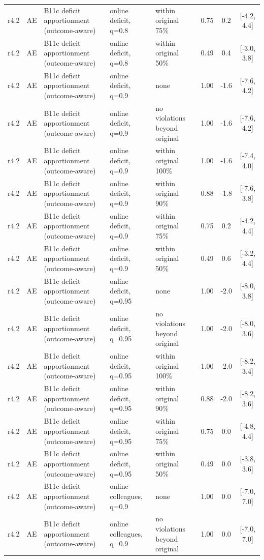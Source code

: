 \documentclass[10pt,onecolumn,letterpaper]{article}
\begin{document}
\begin{longtable}{lllp{4.2cm}p{3.4cm}ccc}
r4.2 & AE & B11c deficit apportionment (outcome-aware) & online deficit, q=0.8 & within original 75\% & 0.75 & 0.2 & [-4.2, 4.4] \\
r4.2 & AE & B11c deficit apportionment (outcome-aware) & online deficit, q=0.8 & within original 50\% & 0.49 & 0.4 & [-3.0, 3.8] \\
r4.2 & AE & B11c deficit apportionment (outcome-aware) & online deficit, q=0.9 & none & 1.00 & -1.6 & [-7.6, 4.2] \\
r4.2 & AE & B11c deficit apportionment (outcome-aware) & online deficit, q=0.9 & no violations beyond original & 1.00 & -1.6 & [-7.6, 4.2] \\
r4.2 & AE & B11c deficit apportionment (outcome-aware) & online deficit, q=0.9 & within original 100\% & 1.00 & -1.6 & [-7.4, 4.0] \\
r4.2 & AE & B11c deficit apportionment (outcome-aware) & online deficit, q=0.9 & within original 90\% & 0.88 & -1.8 & [-7.6, 3.8] \\
r4.2 & AE & B11c deficit apportionment (outcome-aware) & online deficit, q=0.9 & within original 75\% & 0.75 & 0.2 & [-4.2, 4.4] \\
r4.2 & AE & B11c deficit apportionment (outcome-aware) & online deficit, q=0.9 & within original 50\% & 0.49 & 0.6 & [-3.2, 4.4] \\
r4.2 & AE & B11c deficit apportionment (outcome-aware) & online deficit, q=0.95 & none & 1.00 & -2.0 & [-8.0, 3.8] \\
r4.2 & AE & B11c deficit apportionment (outcome-aware) & online deficit, q=0.95 & no violations beyond original & 1.00 & -2.0 & [-8.0, 3.6] \\
r4.2 & AE & B11c deficit apportionment (outcome-aware) & online deficit, q=0.95 & within original 100\% & 1.00 & -2.0 & [-8.2, 3.4] \\
r4.2 & AE & B11c deficit apportionment (outcome-aware) & online deficit, q=0.95 & within original 90\% & 0.88 & -2.0 & [-8.2, 3.6] \\
r4.2 & AE & B11c deficit apportionment (outcome-aware) & online deficit, q=0.95 & within original 75\% & 0.75 & 0.0 & [-4.8, 4.4] \\
r4.2 & AE & B11c deficit apportionment (outcome-aware) & online deficit, q=0.95 & within original 50\% & 0.49 & 0.0 & [-3.8, 3.6] \\
r4.2 & AE & B11c deficit apportionment (outcome-aware) & online colleagues, q=0.9 & none & 1.00 & 0.0 & [-7.0, 7.0] \\
r4.2 & AE & B11c deficit apportionment (outcome-aware) & online colleagues, q=0.9 & no violations beyond original & 1.00 & 0.0 & [-7.0, 7.0] \\

\end{longtable}
\end{document}
